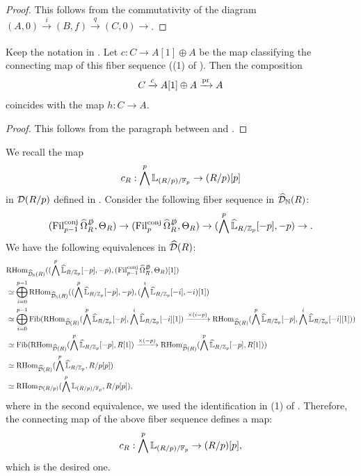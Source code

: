 \documentclass[11pt,a4paper]{amsart}
\begin{document}
\begin{proof}
    This follows from the commutativity of the diagram \((A,0)\xrightarrow[]{i} (B,f)\xrightarrow[]{q} (C,0)\to\).
\end{proof}
\begin{lemma}\label{remark2.9}
    Keep the notation in .
    Let $c:C\to A[1]\oplus A$ be the map classifying the connecting map of this fiber sequence ((1) of ). Then the composition 
    \[C\xrightarrow[]{c}A[1]\oplus A\xrightarrow[]{\operatorname{pr}}A\] coincides with the map $h:C\to A$. 
\end{lemma}
\begin{proof}
This follows from the paragraph between \cite[Corollary 6.6]{petrov2025Nondecomposability} and \cite[Lemma 6.7]{petrov2025Nondecomposability}.
\end{proof}

\begin{construction}\label{remark2.4}
    We recall the map
    \[c_R:\bigwedge^p {\mathbb{L}}_{(R/p)/\mathbb{F}_p}\to (R/p)[p]\] in $\mathcal{D}(R/p)$ defined in \cite[Notation 6.4]{petrov2025Nondecomposability}. Consider the following fiber sequence in $\widehat{\mathcal{D}}_{\mathbb{N}}(R)$:
    \[(\operatorname{Fil}_{p-1}^{\operatorname{conj}}\widehat\Omega_R^{\slashed D},\Theta_R)\to (\operatorname{Fil}_p^{\operatorname{conj}}\widehat\Omega_R^{\slashed D},\Theta_R)\to (\bigwedge^p\widehat{\mathbb{L}}_{R/\mathbb{Z}_p}[-p],-p)\to. \] 
    We have the following equivalences in $\widehat{\mathcal{D}}(R)$:
    \begin{align*}
    &\mathrm{RHom}_{\widehat{\mathcal{D}}_{\mathbb{N}}(R)}((\bigwedge^p\widehat{\mathbb{L}}_{R/\mathbb{Z}_p}[-p],-p),(\operatorname{Fil}_{p-1}^{\operatorname{conj}}\widehat\Omega_R^{\slashed D},\Theta_R)[1])\\
    &\simeq \bigoplus_{i=0}^{p-1}\mathrm{RHom}_{\widehat{\mathcal{D}}_{\mathbb{N}}(R)}((\bigwedge^p\widehat{\mathbb{L}}_{R/\mathbb{Z}_p}[-p],-p),(\bigwedge^i\widehat{\mathbb{L}}_{R/\mathbb{Z}_p}[-i],-i)[1])\\
    &\simeq \bigoplus_{i=0}^{p-1}\operatorname{Fib}(\mathrm{RHom}_{\widehat{\mathcal{D}}(R)}(\bigwedge^p\widehat{\mathbb{L}}_{R/\mathbb{Z}_p}[-p],\bigwedge^i\widehat{\mathbb{L}}_{R/\mathbb{Z}_p}[-i][1])\xrightarrow[]{\times (i-p)} \mathrm{RHom}_{\widehat{\mathcal{D}}(R)}(\bigwedge^p\widehat{\mathbb{L}}_{R/\mathbb{Z}_p}[-p],\bigwedge^i\widehat{\mathbb{L}}_{R/\mathbb{Z}_p}[-i][1]))\\
    &\simeq \operatorname{Fib}(\mathrm{RHom}_{\widehat{\mathcal{D}}(R)}(\bigwedge^p\widehat{\mathbb{L}}_{R/\mathbb{Z}_p}[-p],R[1])\xrightarrow[]{\times (-p)} \mathrm{RHom}_{\widehat{\mathcal{D}}(R)}(\bigwedge^p\widehat{\mathbb{L}}_{R/\mathbb{Z}_p}[-p],R[1]))\\
    &\simeq \mathrm{RHom}_{\widehat{\mathcal{D}}(R)}(\bigwedge^p\widehat{\mathbb{L}}_{R/\mathbb{Z}_p},R/p[p])\\
    &\simeq \mathrm{RHom}_{\mathcal{D}(R/p)}(\bigwedge^p{\mathbb{L}}_{(R/p)/\mathbb{F}_p},R/p[p]),
    \end{align*}
    where in the second equivalence, we used the identification in (1) of .
    Therefore, the connecting map of the above fiber sequence defines a map:
    \[c_R:\bigwedge^p\mathbb{L}_{(R/p)/\mathbb{F}_p}\to (R/p)[p], \] which is the desired one.
\end{construction}
\end{document}
